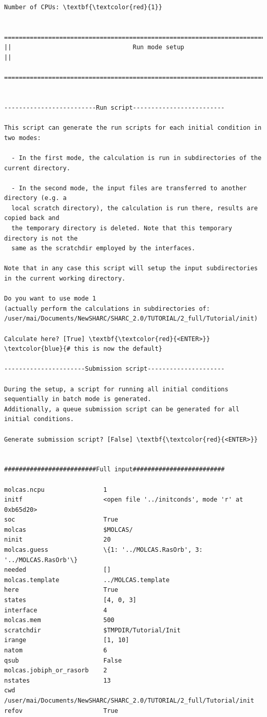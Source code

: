 \documentclass[a4paper,11pt,DIV=15,openany]{scrbook}
\begin{document}
\begin{oframed}
\begin{Verbatim}[commandchars=\\\{\}]
Number of CPUs: \textbf{\textcolor{red}{1}}

  ================================================================================
||                                 Run mode setup                                 ||
  ================================================================================


-------------------------Run script-------------------------

This script can generate the run scripts for each initial condition in two modes:

  - In the first mode, the calculation is run in subdirectories of the current directory.

  - In the second mode, the input files are transferred to another directory (e.g. a 
  local scratch directory), the calculation is run there, results are copied back and 
  the temporary directory is deleted. Note that this temporary directory is not the 
  same as the scratchdir employed by the interfaces.

Note that in any case this script will setup the input subdirectories in the current working directory. 

Do you want to use mode 1 
(actually perform the calculations in subdirectories of: 
/user/mai/Documents/NewSHARC/SHARC_2.0/TUTORIAL/2_full/Tutorial/init)

Calculate here? [True] \textbf{\textcolor{red}{<ENTER>}}     \textcolor{blue}{# this is now the default}

----------------------Submission script---------------------

During the setup, a script for running all initial conditions sequentially in batch mode is generated. 
Additionally, a queue submission script can be generated for all initial conditions.

Generate submission script? [False] \textbf{\textcolor{red}{<ENTER>}}


#########################Full input#########################

molcas.ncpu                1
initf                      <open file '../initconds', mode 'r' at 0xb65d20>
soc                        True
molcas                     $MOLCAS/
ninit                      20
molcas.guess               \{1: '../MOLCAS.RasOrb', 3: '../MOLCAS.RasOrb'\}
needed                     []
molcas.template            ../MOLCAS.template
here                       True
states                     [4, 0, 3]
interface                  4
molcas.mem                 500
scratchdir                 $TMPDIR/Tutorial/Init
irange                     [1, 10]
natom                      6
qsub                       False
molcas.jobiph_or_rasorb    2
nstates                    13
cwd                        /user/mai/Documents/NewSHARC/SHARC_2.0/TUTORIAL/2_full/Tutorial/init
refov                      True


\end{Verbatim}
\end{oframed}
\end{document}
